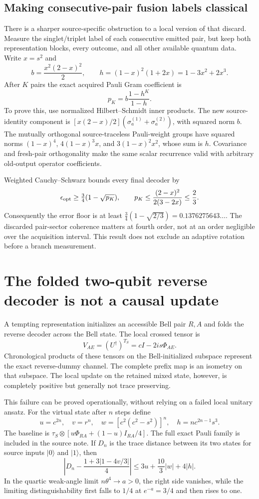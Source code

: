 \documentclass[11pt]{article}
\begin{document}
\subsection{Making consecutive-pair fusion labels classical}

There is a sharper source-specific obstruction to a local version of that
discard. Measure the singlet/triplet label of each consecutive emitted pair,
but keep both representation blocks, every outcome, and all other available
quantum data. Write $x=s^2$ and
\[
 b=\frac{x^2(2-x)^2}{2},\qquad
 h=(1-x)^2(1+2x)=1-3x^2+2x^3.
\]
After $K$ pairs the exact acquired Pauli Gram coefficient is
\[
 p_K=b\frac{1-h^K}{1-h}.
\]
To prove this, use normalized Hilbert--Schmidt inner products. The new
source-identity component is
$[x(2-x)/2](\sigma_a^{(1)}+\sigma_a^{(2)})$, with squared norm $b$.
The mutually orthogonal source-traceless Pauli-weight groups have squared
norms $(1-x)^4$, $4(1-x)^3x$, and $3(1-x)^2x^2$, whose sum is $h$.
Covariance and fresh-pair orthogonality make the same scalar recurrence valid
with arbitrary old-output operator coefficients.

Weighted Cauchy--Schwarz bounds every final decoder by
\[
 \epsilon_{\rm opt}\ge\tfrac34(1-\sqrt{p_K}),\qquad
 p_K\le\frac{(2-x)^2}{2(3-2x)}\le\frac23.
\]
Consequently the error floor is at least
$\tfrac34(1-\sqrt{2/3})=0.1376275643\ldots$.
The discarded pair-sector coherence matters at fourth order, not at an order
negligible over the acquisition interval. This result does not exclude an
adaptive rotation before a branch measurement.

\section{The folded two-qubit reverse decoder is not a causal update}

A tempting representation initializes an accessible Bell pair $R,A$ and
folds the reverse decoder across the Bell state. The local crossed tensor is
\[
 V_{AE}=(U^\dagger)^{T_S}=cI-2is\Phi_{AE}.
\]
Chronological products of these tensors on the Bell-initialized subspace
represent the exact reverse-dummy channel. The complete prefix map is an
isometry on that subspace. The local update on the retained mixed state,
however, is completely positive but generally not trace preserving.

This failure can be proved operationally, without relying on a failed local
unitary ansatz. For the virtual state after $n$ steps define
\[
 u=c^{2n},\quad v=r^n,\quad
 w=[c^2(c^2-s^2)]^n,\quad h=n c^{2n-1}s^3.
\]
The baseline is $\tau_S\otimes[u\Phi_{RA}+(1-u)I_{RA}/4]$.
The full exact Pauli family is included in the source note. If $D_n$ is the
trace distance between its two states for source inputs $|0\rangle$ and
$|1\rangle$, then
\begin{equation}
 \left|D_n-\frac{1+3|1-4v/3|}{4}\right|
 \le3u+\frac{10}{3}|w|+4|h|.
 \label{eq:Dvirtual}
\end{equation}
In the quartic weak-angle limit $n\theta^4\to a>0$, the right side vanishes,
while the limiting distinguishability first falls to $1/4$ at $e^{-a}=3/4$
and then rises to one.
\end{document}
